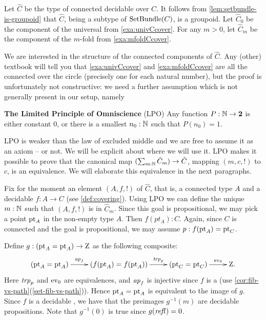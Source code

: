\begin{definition} \label{def:hatC}
Let $\hat C$ be the type of connected decidable \coverings over $C$.
It follows from \cref{lem:setbundle-is-groupoid} that $\hat C$, 
being a subtype of $\operatorname{\mathrm{SetBundle}}(C)$, is a groupoid.
Let $\hat C_0$ be the component of the universal \covering
from \cref{exa:univCcover}. For any $m>0$, let $\hat C_m$ be the component of 
the $m$-fold \covering from \cref{exa:mfoldCcover}.
\end{definition}

We are interested in the structure of the connected components of $\hat C$. 
Any (other) textbook will tell you that \cref{exa:univCcover} and \cref{exa:mfoldCcover}
are all the connected \coverings over 
the circle (precisely one for each natural number), but the proof is unfortunately not constructive: 
we need a further assumption which is not generally present in our setup, namely

\begin{principle}
  \label{LPO}
  {\bf The Limited Principle of Omniscience} (LPO)
  Any function $P:\mathbb{N}\to\mathbf{2}$ is either constant $0$,
  or there is a smallest $n_0:\mathbb{N}$ such that $P(n_0)=1$.
\end{principle}

LPO is weaker than the law of excluded middle and we are free to assume it as an axiom -- or not.
We will be explicit about where we will use it.
LPO makes it possible to prove that the canonical map $(\sum_{m:\mathbb{N}} \hat C_m) \to \hat C$,
mapping $(m,c,!)$ to $c$, is an equivalence.
We will elaborate this equivalence in the next paragraphs.

Fix for the moment an element $(A,f,!)$ of $\hat C$, that is,
a connected type $A$ and a decidable \covering  $f:A\to C$ (see \cref{def:covering}).
Using LPO we can define the unique $m:\mathbb{N}$ such that $(A,f,!)$ is in $\hat C_m$.
Since this goal is propositional, we may pick a point ${\mathord{\mathrm{pt}}}_A$ in 
the non-empty type $A$. Then $f(pt_A) : C$. Again, since $C$ is connected
and the goal is propositional, we may assume $p: f({\mathord{\mathrm{pt}}}_A) = {\mathord{\mathrm{pt}}}_C$.


Define $g: ({\mathord{\mathrm{pt}}}_A={\mathord{\mathrm{pt}}}_A)\to\mathrm{Z}$ as the following composite:
\[
\xymatrix{
(\pt_A=\pt_A)\ar[r]^-{\ap{f}}&
(f(\pt_A)=f(\pt_A))\ar[r]^-{\trp{p}}&
(\pt_C=\pt_C)\ar[r]^-{\ev_0}&
\zet.}
\]
Here $\mathop{\mathit{trp}_{p}}$ and $\mathrm{ev}_0$ are equivalences, and $\mathop{{\it ap}_{f}}$ is injective
since $f$ is a \covering (use \cref{cor:fib-vs-path}(\ref{set-fib-vs-path})).
Hence ${\mathord{\mathrm{pt}}}_A={\mathord{\mathrm{pt}}}_A$ is equivalent to the image of $g$.
Since $f$ is a decidable \covering, we have that the preimages $g^{-1}(m)$
are decidable propositions. Note that $g^{-1}(0)$ is true since $g(\mathop{{\it refl}_{}})=0$.

